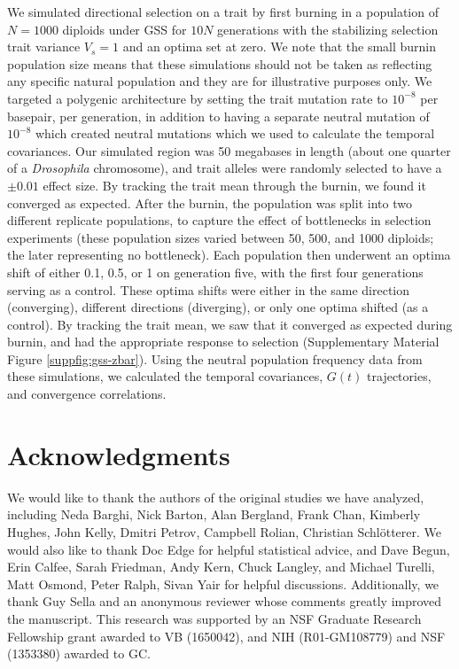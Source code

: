 \documentclass[11pt]{article}
\begin{document}
We simulated directional selection on a trait by first burning in a population
of $N = 1000$ diploids under GSS for $10N$ generations with the stabilizing
selection trait variance $V_s = 1$ and an optima set at zero.  We note that the
small burnin population size means that these simulations should not be taken
as reflecting any specific natural population and they are for illustrative
purposes only.  We targeted a polygenic architecture by setting the trait
mutation rate to $10^{-8}$ per basepair, per generation, in addition to having
a separate neutral mutation of $10^{-8}$ which created neutral mutations which
we used to calculate the temporal covariances. Our simulated region was 50
megabases in length (about one quarter of a \emph{Drosophila} chromosome), and
trait alleles were randomly selected to have a $\pm 0.01$ effect size. By
tracking the trait mean through the burnin, we found it converged as expected.
After the burnin, the population was split into two different replicate
populations, to capture the effect of bottlenecks in selection experiments
(these population sizes varied between 50, 500, and 1000 diploids; the
later representing no bottleneck). Each population then underwent an optima
shift of either 0.1, 0.5, or 1 on generation five, with the first four
generations serving as a control. These optima shifts were either in the same
direction (converging), different directions (diverging), or only one optima
shifted (as a control). By tracking the trait mean, we saw that it converged as
expected during burnin, and had the appropriate response to selection
(Supplementary Material Figure \ref{suppfig:gss-zbar}). Using the neutral
population frequency data from these simulations, we calculated the temporal
covariances, $G(t)$ trajectories, and convergence correlations.


\section{Acknowledgments} 

We would like to thank the authors of the original studies we have analyzed,
including Neda Barghi, Nick Barton, Alan Bergland, Frank Chan, Kimberly Hughes,
John Kelly, Dmitri Petrov, Campbell Rolian, Christian Schl{\"o}tterer. We would
also like to thank Doc Edge for helpful statistical advice, and Dave Begun,
Erin Calfee, Sarah Friedman, Andy Kern, Chuck Langley, and Michael Turelli,
Matt Osmond, Peter Ralph, Sivan Yair for helpful discussions. Additionally, we
thank Guy Sella and an anonymous reviewer whose comments greatly improved the
manuscript. This research was supported by an NSF Graduate Research Fellowship
grant awarded to VB (1650042), and NIH (R01-GM108779) and NSF (1353380) awarded
to GC.

\printbibliography
\end{document}
